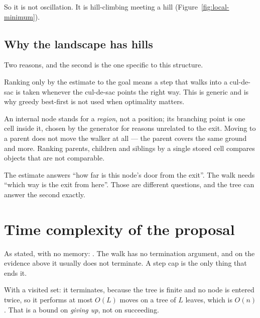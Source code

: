 \documentclass[11pt,a4paper]{article}
\begin{document}
So it is not oscillation. It is hill-climbing meeting a hill
(Figure~\ref{fig:local-minimum}).



\subsection{Why the landscape has hills}

Two reasons, and the second is the one specific to this structure.

\begin{description}[leftmargin=*,style=nextline,itemsep=5pt]
  \item[Greedy search discards $g$.] Ranking only by the estimate to the goal
    means a step that walks into a cul-de-sac is taken whenever the cul-de-sac
    points the right way. This is generic and is why greedy best-first is not
    used when optimality matters.
  \item[A node's stored point is not where the walker is.] An internal node
    stands for a \emph{region}, not a position; its branching point is one cell
    inside it, chosen by the generator for reasons unrelated to the exit. Moving
    to a parent does not move the walker at all --- the parent covers the same
    ground and more. Ranking parents, children and siblings by a single stored
    cell compares objects that are not comparable.
\end{description}

\begin{keypoint}
The estimate answers ``how far is this node's door from the exit''. The walk
needs ``which way is the exit from here''. Those are different questions, and
the tree can answer the second exactly.
\end{keypoint}

\section{Time complexity of the proposal}

As stated, with no memory: . The walk has no termination
argument, and on the evidence above it usually does not terminate. A step cap is
the only thing that ends it.

With a visited set: it terminates, because the tree is finite and no node is
entered twice, so it performs at most $O(L)$ moves on a tree of $L$ leaves,
which is $O(n)$. That is a bound on \emph{giving up}, not on succeeding.
\end{document}
